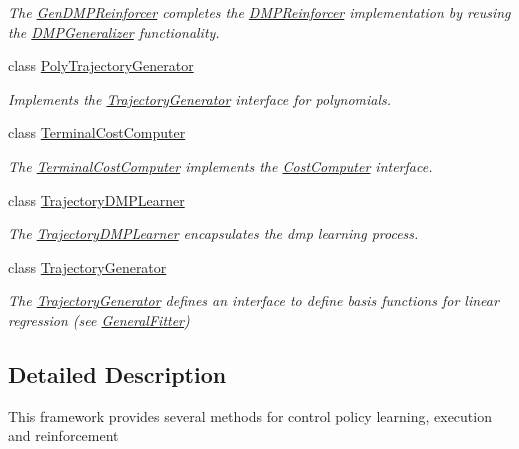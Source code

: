 \begin{DoxyCompactItemize}
\begin{DoxyCompactList}\small\item\em \-The \hyperlink{classGenDMPReinforcer}{\-Gen\-D\-M\-P\-Reinforcer} completes the \hyperlink{classDMPReinforcer}{\-D\-M\-P\-Reinforcer} implementation by reusing the \hyperlink{classDMPGeneralizer}{\-D\-M\-P\-Generalizer} functionality. \end{DoxyCompactList}\item 
class \hyperlink{classPolyTrajectoryGenerator}{\-Poly\-Trajectory\-Generator}
\begin{DoxyCompactList}\small\item\em \-Implements the \hyperlink{classTrajectoryGenerator}{\-Trajectory\-Generator} interface for polynomials. \end{DoxyCompactList}\item 
class \hyperlink{classTerminalCostComputer}{\-Terminal\-Cost\-Computer}
\begin{DoxyCompactList}\small\item\em \-The \hyperlink{classTerminalCostComputer}{\-Terminal\-Cost\-Computer} implements the \hyperlink{classCostComputer}{\-Cost\-Computer} interface. \end{DoxyCompactList}\item 
class \hyperlink{classTrajectoryDMPLearner}{\-Trajectory\-D\-M\-P\-Learner}
\begin{DoxyCompactList}\small\item\em \-The \hyperlink{classTrajectoryDMPLearner}{\-Trajectory\-D\-M\-P\-Learner} encapsulates the dmp learning process. \end{DoxyCompactList}\item 
class \hyperlink{classTrajectoryGenerator}{\-Trajectory\-Generator}
\begin{DoxyCompactList}\small\item\em \-The \hyperlink{classTrajectoryGenerator}{\-Trajectory\-Generator} defines an interface to define basis functions for linear regression (see \hyperlink{classGeneralFitter}{\-General\-Fitter}) \end{DoxyCompactList}\end{DoxyCompactItemize}


\subsection{\-Detailed \-Description}
\-This framework provides several methods for control policy learning, execution and reinforcement 